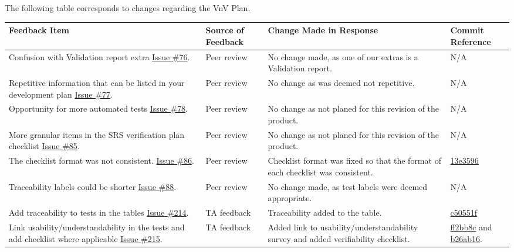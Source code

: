 \documentclass{article}
\begin{document}
The following table corresponds to changes regarding the VnV Plan.
\begin{longtable}{|p{4cm}|p{1.5cm}|p{4cm}|p{1.5cm}|}
    \hline
    \textbf{Feedback Item} & \textbf{Source of Feedback} & \textbf{Change Made in Response} & \textbf{Commit Reference} \\
    \hline
    \endfirsthead
    \hline
    \endhead
    \hline
    \endfoot
    \hline
    \endlastfoot
    Confusion with Validation report extra \href{https://github.com/gr812b/CVT-Simulator/issues/76}{Issue \#76}. & Peer review  & No change made, as one of our extras is a Validation report. & N/A \\
    \hline 
    Repetitive information that can be listed in your development plan \href{https://github.com/gr812b/CVT-Simulator/issues/77}{Issue \#77}. & Peer review & No change as was deemed not repetitive. & N/A \\
    \hline
    Opportunity for more automated tests \href{https://github.com/gr812b/CVT-Simulator/issues/78}{Issue \#78}. & Peer review & No change as not planed for this revision of the product. & N/A \\
    \hline
    More granular items in the SRS verification plan checklist \href{https://github.com/gr812b/CVT-Simulator/issues/85}{Issue \#85}. & Peer review & No change as not planed for this revision of the product. & N/A \\
    \hline
    The checklist format was not consistent. \href{https://github.com/gr812b/CVT-Simulator/issues/86}{Issue \#86}. & Peer review & Checklist format was fixed so that the format of each checklist was consistent.& 
    \href{https://github.com/gr812b/CVT-Simulator/commit/13e3596e7e3ba6fa7feca6426c6248aba93e2b49}{13e3596} \\
    \hline 
    Traceability labels could be shorter \href{https://github.com/gr812b/CVT-Simulator/issues/88}{Issue \#88}. & Peer review  & No change made, as test labels were deemed appropriate.  & N/A \\
    \hline 
    Add traceability to tests in the tables \href{https://github.com/gr812b/CVT-Simulator/issues/214}{Issue \#214}. & TA feedback & Traceability added to the table. & 
    \href{https://github.com/gr812b/CVT-Simulator/commit/c50551feaf252118ed75dcdf9ee6ea1eb685dc0d}{c50551f} \\
    \hline
    Link usability/understandability in the tests and add checklist where applicable \href{https://github.com/gr812b/CVT-Simulator/issues/215}{Issue \#215}. & TA feedback & Added link to usability/understandability survey and added verifiability checklist. & 
    \href{https://github.com/gr812b/CVT-Simulator/commit/ff2bb8c002761baa2ea05bca5b202977b40ac1b8}{ff2bb8c} and \href{https://github.com/gr812b/CVT-Simulator/commit/https://github.com/gr812b/CVT-Simulator/commit/b26ab16316d9372e622200558502ee3e089b03f9}{b26ab16}.\\

\end{longtable}
\end{document}
